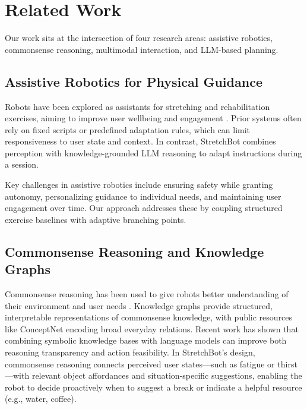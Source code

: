 \documentclass[pdflatex,sn-basic,Numbered,iicol,twocolumn]{sn-jnl}%
\begin{document}
\section{Related Work}
\label{sec:related}

Our work sits at the intersection of four research areas: assistive robotics, commonsense reasoning, multimodal interaction, and LLM-based planning.

\subsection{Assistive Robotics for Physical Guidance}

Robots have been explored as assistants for stretching and rehabilitation exercises, aiming to improve user wellbeing and engagement \cite{Aceituno-Valenzuela2020,Robins2012}. Prior systems often rely on fixed scripts or predefined adaptation rules, which can limit responsiveness to user state and context. In contrast, StretchBot combines perception with knowledge-grounded LLM reasoning to adapt instructions during a session.

Key challenges in assistive robotics include ensuring safety while granting autonomy, personalizing guidance to individual needs, and maintaining user engagement over time. Our approach addresses these by coupling structured exercise baselines with adaptive branching points.

\subsection{Commonsense Reasoning and Knowledge Graphs}

Commonsense reasoning has been used to give robots better understanding of their environment and user needs \cite{Hogan2021}. Knowledge graphs provide structured, interpretable representations of commonsense knowledge, with public resources like ConceptNet \cite{Speer2017} encoding broad everyday relations. Recent work \cite{Zhang2022} has shown that combining symbolic knowledge bases with language models can improve both reasoning transparency and action feasibility. In StretchBot's design, commonsense reasoning connects perceived user states—such as fatigue or thirst—with relevant object affordances and situation-specific suggestions, enabling the robot to decide proactively when to suggest a break or indicate a helpful resource (e.g., water, coffee).
\end{document}
